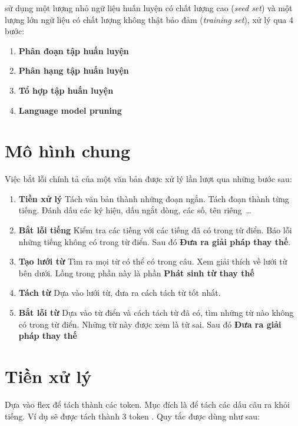 \documentclass[a4paper,oneside]{book} %
\theoremstyle{break}
\begin{document}
\cite{text-tiling} sử dụng một lượng nhỏ ngữ liệu huấn luyện có chất
lượng cao (\textit{seed set}) và một lượng lớn ngữ liệu có chất lượng
không thật bảo đảm (\textit{training set}), xử lý qua 4 bước:
\begin{enumerate}
\item \textbf{Phân đoạn tập huấn luyện}
\item \textbf{Phân hạng tập huấn luyện}
\item \textbf{Tổ hợp tập huấn luyện}
\item \textbf{Language model pruning}
\end{enumerate}



\section{Mô hình chung}

Việc bắt lỗi chính tả của một văn bản được xử lý lần lượt qua những
bước sau:
\begin{enumerate}
\item \textbf{Tiền xử lý} Tách văn bản thành những đoạn ngắn. Tách
  đoạn thành từng tiếng. Đánh dấu các ký hiệu, dấu ngắt dòng, các số,
  tên riêng~\ldots
\item \textbf{Bắt lỗi tiếng} Kiểm tra các tiếng với các tiếng đã có
  trong từ điển. Báo lỗi những tiếng không có trong từ điển. Sau đó 
  \textbf{Đưa ra giải pháp thay thế}.
\item \textbf{Tạo lưới từ} Tìm ra mọi từ có thể có trong câu. Xem
  giải thích về lưới từ bên dưới. Lồng trong phần này là phần
  \textbf{Phát sinh từ thay thế}
\item \textbf{Tách từ} Dựa vào lưới từ, đưa ra cách tách từ tốt nhất.
\item \textbf{Bắt lỗi từ} Dựa vào từ điển và cách tách từ đã có,
  tìm những từ nào không có trong từ điển. Những từ này được xem là từ
  sai. Sau đó \textbf{Đưa ra giải pháp thay thế}
\end{enumerate}

\section{Tiền xử lý}
\label{sub:preprocess}

Dựa vào flex để tách thành các token. Mục đích là để tách các dấu câu
ra khỏi tiếng. Ví dụ  sẽ được tách thành 3 token
  . Quy tắc được dùng như sau:
\end{document}
